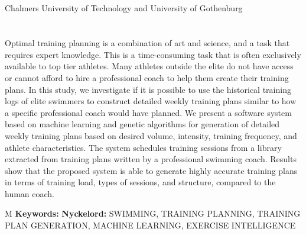 \thesisImprintTitle\\
\thesisImprintSubtitle\\
\thesisAuthor\\
\thesisDepartment\\
Chalmers University of Technology and University of Gothenburg\setlength{\parskip}{0.5cm}

\thispagestyle{plain}			%
\section*{\abstractname}
Optimal training planning is a combination of art and science, and a task that requires expert knowledge. 
This is a time-consuming task that is often exclusively available to top tier athletes. 
Many athletes outside the elite do not have access or cannot afford to hire a professional coach to help them create their training plans.
In this study, we investigate if it is possible to use the historical training logs of elite swimmers to construct detailed weekly training plans similar to how a specific professional coach would have planned.
We present a software system based on machine learning and genetic algorithms for generation of detailed weekly training plans based on desired volume, intensity, training frequency, and athlete characteristics.
The system schedules training sessions from a library extracted from training plans written by a professional swimming coach.
Results show that the proposed system is able to generate highly accurate training plans in terms of training load, types of sessions, and structure, compared to the human coach.

\vfill
\if\thesisType M
    \textbf{Keywords:}
\else
    \textbf{Nyckelord:}
\fi
SWIMMING, TRAINING PLANNING, TRAINING PLAN GENERATION, MACHINE LEARNING, EXERCISE INTELLIGENCE
\if{}
\newpage				%
\thispagestyle{empty}
\mbox{}
\fi
